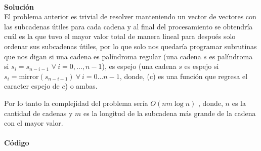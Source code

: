 \documentclass[12pt]{article}
\begin{document}
\\
\textbf{\large Solución}\\
El problema anterior es trivial de resolver manteniendo un
vector de vectores con las subcadenas útiles para cada cadena
y al final del procesamiento se obtendría cuál es la que tuvo 
el mayor valor total de manera lineal para después solo ordenar sus
subcadenas útiles, por lo que solo nos quedaría programar 
subrutinas que nos digan si una cadena es palíndroma regular (una cadena $s$ es palíndroma si $s_i = s_{n-i-1}$ $\forall\ i = 0, \dots, n-1$), es espejo (una cadena $s$ es espejo si  $s_i = \text{mirror}(s_{n-i-1}) \ \forall\ i = 0 \dots n-1$, donde, (c) es una función que regresa el caracter espejo de $c$) o ambas.

Por lo tanto la complejidad del problema sería $O(n m \log n)$ , donde, $n$ es la cantidad de cadenas y $m$ es la longitud de la subcadena más grande de la cadena con el mayor valor.\\
\\
\textbf{\large Código}\\
\end{document}
